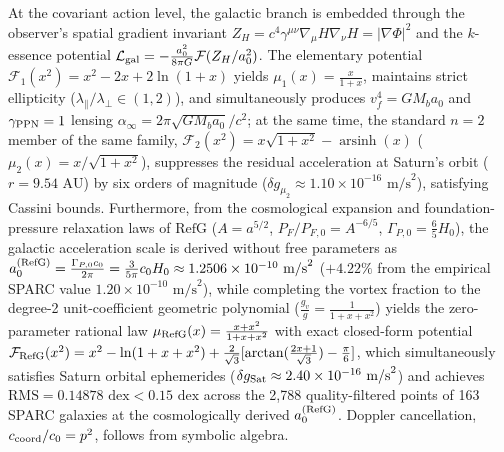 \documentclass[11pt,a4paper]{article}
\newcommand{\RefG}{\mathrm{RefG}}
\begin{document}
\begin{enumerate}[label=\arabic*.]
At the covariant action level, the galactic branch is embedded through the observer's spatial gradient invariant $Z_H = c^4\gamma^{\mu\nu}\nabla_\mu H\nabla_\nu H = |\nabla\Phi|^2$ and the $k$-essence potential $\mathcal{L}_{\rm gal} = -\frac{a_0^2}{8\pi G}\mathcal{F}(Z_H/a_0^2)$. The elementary potential $\mathcal{F}_1(x^2) = x^2 - 2x + 2\ln(1+x)$ yields $\mu_1(x) = \frac{x}{1+x}$, maintains strict ellipticity ($\lambda_\parallel/\lambda_\perp \in (1,2)$), and simultaneously produces $v_f^4 = GM_ba_0$ and $\gamma_{\rm PPN}=1$ lensing $\alpha_\infty = 2\pi\sqrt{GM_ba_0}/c^2$; at the same time, the standard $n=2$ member of the same family, $\mathcal{F}_2(x^2) = x\sqrt{1+x^2} - \operatorname{arsinh}(x)$ ($\mu_2(x) = x/\sqrt{1+x^2}$), suppresses the residual acceleration at Saturn's orbit ($r = 9.54\text{ AU}$) by six orders of magnitude ($\delta g_{\mu_2} \approx 1.10\times 10^{-16}\text{ m/s}^2$), satisfying Cassini bounds. Furthermore, from the cosmological expansion and foundation-pressure relaxation laws of $\RefG$ ($A=a^{5/2}$, $P_F/P_{F,0}=A^{-6/5}$, $\Gamma_{P,0}=\frac{6}{5}H_0$), the galactic acceleration scale is derived without free parameters as $a_0^{\rm (RefG)} = \frac{\Gamma_{P,0}c_0}{2\pi} = \frac{3}{5\pi}c_0 H_0 \approx 1.2506\times 10^{-10}\text{ m/s}^2$ ($+4.22\%$ from the empirical SPARC value $1.20\times 10^{-10}\text{ m/s}^2$), while completing the vortex fraction to the degree-2 unit-coefficient geometric polynomial ($\frac{g_v}{g}=\frac{1}{1+x+x^2}$) yields the zero-parameter rational law $\mu_{\rm RefG}(x)=\frac{x+x^2}{1+x+x^2}$ with exact closed-form potential $\mathcal{F}_{\rm RefG}(x^2) = x^2 - \ln(1+x+x^2) + \frac{2}{\sqrt{3}}[\arctan(\frac{2x+1}{\sqrt{3}})-\frac{\pi}{6}]$, which simultaneously satisfies Saturn orbital ephemerides ($\delta g_{\rm Sat} \approx 2.40\times 10^{-16}\text{ m/s}^2$) and achieves $\text{RMS} = 0.14878\text{ dex} < 0.15\text{ dex}$ across the 2,788 quality-filtered points of 163 SPARC galaxies at the cosmologically derived $a_0^{\rm (RefG)}$. Doppler cancellation, $c_{\rm coord}/c_0=p^2$, follows from symbolic algebra.


\end{enumerate}
\end{document}
